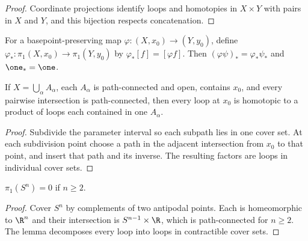 \begin{proof}
\sketch Coordinate projections identify loops and homotopies in $X\times Y$
with pairs in $X$ and $Y$, and this bijection respects concatenation.
\end{proof}

\begin{definition}
\label{def:induced-homomorphism}


For a basepoint-preserving map $\varphi:(X,x_0)\to(Y,y_0)$, define
$\varphi_*:\pi_1(X,x_0)\to\pi_1(Y,y_0)$ by $\varphi_*[f]=[\varphi f]$.
Then $(\varphi\psi)_*=\varphi_*\psi_*$ and $\one_*=\one$.
\end{definition}

\begin{lemma}
\label{lem:loop-decomposition-open-cover}



If $X=\bigcup_\alpha A_\alpha$, each $A_\alpha$ is path-connected and open,
contains $x_0$, and every pairwise intersection is path-connected, then every
loop at $x_0$ is homotopic to a product of loops each contained in one
$A_\alpha$.
\end{lemma}

\begin{proof}
\sketch Subdivide the parameter interval so each subpath lies in one cover set.
At each subdivision point choose a path in the adjacent intersection from $x_0$
to that point, and insert that path and its inverse. The resulting factors are
loops in individual cover sets.
\end{proof}

\begin{proposition}[$\pi_1(S^n) = 0$ for $n \ge 2$]
\label{prop:pi1-sphere-trivial-n-geq-2}



$\pi_1(S^n)=0$ if $n\geq2$.
\end{proposition}

\begin{proof}
\sketch Cover $S^n$ by complements of two antipodal points. Each is
homeomorphic to $\R^n$ and their intersection is $S^{n-1}\times\R$, which is
path-connected for $n\geq2$. The lemma decomposes every loop into loops in
contractible cover sets.
\end{proof}

